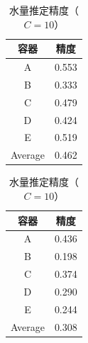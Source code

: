 \documentclass[submit,techrep,noauthor]{ipsj}
\begin{document}
\begin{table}[!t]
  \small
  \centering
  \caption{水量推定精度（$C=10$）}
  \begin{minipage}[t]{0.45\linewidth}
    \centering
    \begin{tabular}{c|c} \hline\hline
    容器 & 精度 \\ \hline
    A & 0.553 \\
    B & 0.333 \\
    C & 0.479 \\
    D & 0.424 \\
    E & 0.519 \\ \hline
    Average & 0.462 \\ \hline
    \end{tabular}
    \label{tab:result_10_dependent}
  \end{minipage}
  \begin{minipage}[t]{0.45\linewidth}
    \centering
    \begin{tabular}{c|c} \hline\hline
    容器 & 精度 \\ \hline
    A & 0.436 \\
    B & 0.198 \\
    C & 0.374 \\
    D & 0.290 \\
    E & 0.244 \\ \hline
    Average & 0.308 \\ \hline
    \end{tabular}
    \label{tab:result_10_independent}
  \end{minipage}
  \label{tab:result_10}
\end{table}
\end{document}
